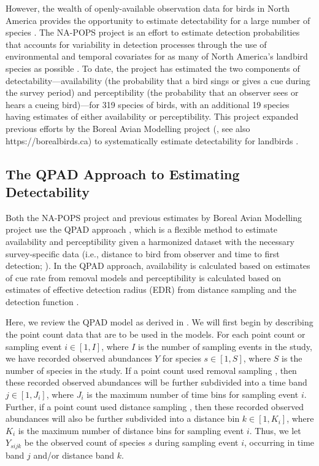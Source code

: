 \documentclass[12pt]{article}
\begin{document}
\par However, the wealth of openly-available observation data for birds in North America provides the opportunity to estimate detectability for a large number of species \citep{bennett_how_2024}. 
The NA-POPS project is an effort to estimate detection probabilities that accounts for variability in detection processes through the use of environmental and temporal covariates for as many of North America’s landbird species as possible \citep{edwards_point_2023}.
To date, the project has estimated the two components of detectability---availability (the probability that a bird sings or gives a cue during the survey period) and perceptibility (the probability that an observer sees or hears a cueing bird)---for 319 species of birds, with an additional 19 species having estimates of either availability or perceptibility. 
This project expanded previous efforts by the Boreal Avian Modelling project (\citet{cumming_toward_2010}, see also https://borealbirds.ca) to systematically estimate detectability for landbirds \citep{solymos_calibrating_2013, solymos_evaluating_2018}.

\subsection{The QPAD Approach to Estimating Detectability}
\par Both the NA-POPS project and previous estimates by Boreal Avian Modelling project use the QPAD approach \citep{solymos_calibrating_2013}, which is a flexible method to estimate availability and perceptibility given a harmonized dataset with the necessary survey-specific data (i.e., distance to bird from observer and time to first detection; \citet{barker_ecological_2015}).
In the QPAD approach, availability is calculated based on estimates of cue rate from removal models \citep{farnsworth_removal_2002, alldredge_time--detection_2007} and perceptibility is calculated based on estimates of effective detection radius (EDR) from distance sampling and the detection function \citep{buckland_introduction_2001}.

\par Here, we review the QPAD model as derived in \citet{solymos_calibrating_2013}.
We will first begin by describing the point count data that are to be used in the models.
For each point count or sampling event $i \in [1, I]$, where $I$ is the number of sampling events in the study, we have recorded observed abundances $Y$ for species $s \in [1,S]$, where $S$ is the number of species in the study.
If a point count used removal sampling \citep{alldredge_time--detection_2007, farnsworth_removal_2002}, then these recorded observed abundances will be further subdivided into a time band $j \in [1,J_i]$, where $J_i$ is the maximum number of time bins for sampling event $i$.
Further, if a point count used distance sampling \citep{buckland_introduction_2001, buckland_distance_2015}, then these recorded observed abundances will also be further subdivided into a distance bin $k \in [1,K_i]$, where $K_i$ is the maximum number of distance bins for sampling event $i$.
Thus, we let $Y_{sijk}$ be the observed count of species $s$ during sampling event $i$, occurring in time band $j$ and/or distance band $k$.
\end{document}
